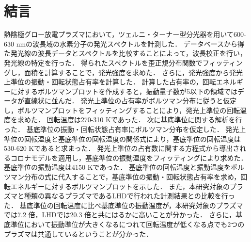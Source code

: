 \chapter{結言}

熱陰極グロー放電プラズマにおいて，ツェルニ・ターナー型分光器を用いて600-630 nmの波長域の水素分子の発光スペクトルを計測した．
データベースから得た発光線の波長データとスペクトルを比較することによって，波長校正を行い，発光線の特定を行った．
得られたスペクトルを歪正規分布関数でフィッティングし，面積を計算することで，発光強度を求めた．
さらに，発光強度から発光上準位の振動・回転状態占有率を計算した．
計算した占有率の，回転エネルギーに対するボルツマンプロットを作成すると，振動量子数が5以下の領域ではデータが直線状に並んだ．
発光上準位の占有率がボルツマン分布に従うと仮定し，ボルツマンプロットをフィッティングすることにより，発光上準位の回転温度を求めた．
回転温度は270-310 Kであった．
次に基底準位に関する解析を行った．
基底準位の振動・回転状態占有率にボルツマン分布を仮定した．
発光上準位の回転温度と基底準位の回転温度の関係式により，基底準位の回転温度は530-620 Kであると求まった．
発光上準位の占有数に関する方程式から導出されるコロナモデルを適用し，基底準位の振動温度をフィッティングにより求めた．
基底準位の振動温度は4150 Kであった．
基底準位の回転温度と振動温度をボルツマン分布の式に代入することで，基底準位の振動・回転状態占有率を求め，回転エネルギーに対するボルツマンプロットを示した．
また，本研究対象のプラズマと種類の異なるプラズマであるLHDで行われた計測結果との比較を行った．
基底準位の回転温度に比べ基底準位の振動温度が，本研究対象のプラズマでは7.2 倍，LHDでは20.3 倍と共にはるかに高いことが分かった．
さらに，基底準位において振動準位が大きくなるにつれて回転温度が低くなる点でも2つのプラズマは共通しているということが分かった．